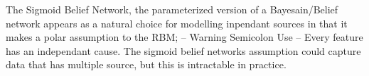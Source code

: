 The Sigmoid Belief Network, the parameterized version of a Bayesain/Belief network appears as a natural choice for modelling inpendant sources in that it makes a polar assumption to the RBM; -- Warning Semicolon Use -- Every feature has an independant cause. The sigmoid belief networks assumption could capture data that has multiple source, but this is intractable in practice.


